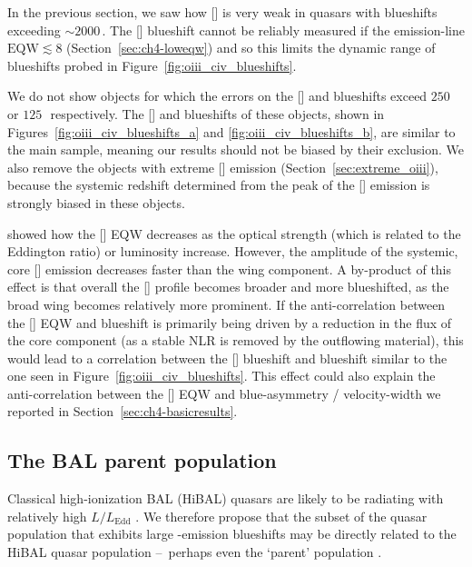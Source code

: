 In the previous section, we saw how [] is very weak in quasars with  blueshifts exceeding $\sim2000$\,\kms. 
The [] blueshift cannot be reliably measured if the emission-line $\text{EQW} \lesssim 8$ (Section~\ref{sec:ch4-loweqw}) and so this limits the dynamic range of  blueshifts probed in Figure~\ref{fig:oiii_civ_blueshifts}. 

We do not show objects for which the errors on the [] and  blueshifts exceed $250$ or $125$\,\kms\, respectively. 
The [] and  blueshifts of these objects, shown in Figures~\ref{fig:oiii_civ_blueshifts_a} and \ref{fig:oiii_civ_blueshifts_b}, are similar to the main sample, meaning our results should not be biased by their exclusion.  
We also remove the objects with extreme [] emission (Section~\ref{sec:extreme_oiii}), because the systemic redshift determined from the peak of the [] emission is strongly biased in these objects. 

\citet{shen14} showed how the [] EQW decreases as the optical  strength (which is related to the Eddington ratio) or luminosity increase. 
However, the amplitude of the systemic, core [] emission decreases faster than the wing component.
A by-product of this effect is that overall the [] profile becomes broader and more blueshifted, as the broad wing becomes relatively more prominent.
If the anti-correlation between the [] EQW and  blueshift is primarily being driven by a reduction in the flux of the core component (as a stable NLR is removed by the outflowing material), this would lead to a correlation between the [] blueshift and  blueshift similar to the one seen in Figure~\ref{fig:oiii_civ_blueshifts}. 
This effect could also explain the anti-correlation between the [] EQW and blue-asymmetry / velocity-width we reported in Section~\ref{sec:ch4-basicresults}. 

\subsection{The BAL parent population}

Classical high-ionization BAL (HiBAL) quasars are likely to be radiating with relatively high $L/L_{\text{Edd}}$ \citep[e.g.][]{zhang14}. 
We therefore propose that the subset of the quasar population that exhibits large -emission blueshifts may be directly related to the HiBAL quasar population \---\ perhaps even the `parent' population \citep{richards06conf}. 

